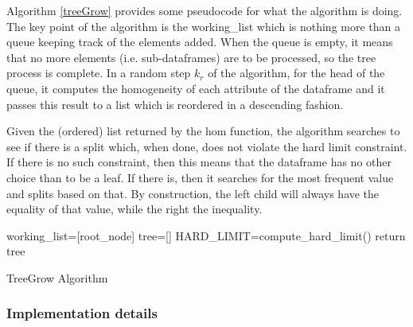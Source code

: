 \documentclass[sigconf]{acmart}
\begin{document}
Algorithm \ref{treeGrow} provides some pseudocode for what the algorithm is doing. The key point of the algorithm is the working\_list which is nothing more than a queue keeping track of the elements added. When the queue is empty, it means that no more elements (i.e. sub-dataframes) are to be processed, so the tree process is complete. In a random step $k_r$ of the algorithm, for the head of the queue, it computes the homogeneity of each attribute of the dataframe and it passes this result to a list which is reordered in a descending fashion.

Given the (ordered) list returned by the hom function, the algorithm searches to see if there is a split which, when done, does not violate the hard limit constraint. If there is no such constraint, then this means that the dataframe has no other choice than to be a leaf. If there is, then it searches for the most frequent value and splits based on that. By construction, the left child will always have the equality of that value, while the right the inequality.



\begin{algorithm}[h!]
\SetAlgoLined
{}
 working\_list=[root\_node]\;
 tree=[]\;
 HARD\_LIMIT=compute\_hard\_limit()\;
 return tree\;
 \caption{TreeGrow Algorithm}\label{treeGrow}
\end{algorithm}







\subsubsection{Implementation details}
\end{document}
